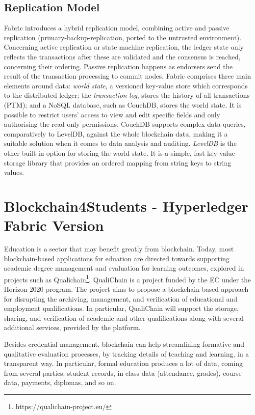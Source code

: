 \documentclass[12pt,a4paper]{article}
\theoremstyle{definition}
\begin{document}
\subsection{Replication Model}
Fabric introduces a hybrid replication model, combining active and passive replication (primary-backup-replication, ported to the untrusted environment). Concerning active replication or state machine replication, the ledger state only reflects the transactions after these are validated and the consensus is reached, concerning their ordering.  Passive replication happens as endorsers send the result of the transaction processing to commit nodes. Fabric comprises three main elements around data: \emph{world state}, a versioned key-value store which corresponds to the distributed ledger; the \emph{transaction log}, stores the history of all transactions (PTM); and a NoSQL database, such as CouchDB, stores the world state. It is possible to restrict users' access to view and edit specific fields and only authorising the read-only permissions.  CouchDB supports complex data queries, comparatively to LevelDB, against the whole blockchain data, making it a suitable solution when it comes to data analysis and auditing. \emph{LevelDB} is the other built-in option for storing the world state. It is a simple, fast key-value storage library that provides an ordered mapping from string keys to string values.


\section{Blockchain4Students - Hyperledger Fabric Version}
 Education is a sector that may benefit greatly from blockchain. Today, most blockchain-based applications for eduation are directed towards supporting academic degree management and evaluation for learning outcomes, explored in projects such as Qualichain\footnote{https://qualichain-project.eu/}. QualiChain is a project funded by the EC under the Horizon 2020 program. The project aims to propose a blockchain-based approach for disrupting the archiving, management, and verification of educational and employment qualifications. In particular, QualiChain will support the storage,  sharing, and verification of academic and other qualifications along with several additional services, provided by the platform.

Besides credential management, blockchain can help streamlining formative and qualitative evaluation processes, by tracking details of teaching and learning, in a transparent way. In particular, formal education produces a lot of data, coming from several parties: student records, in-class data (attendance, grades), course data, payments, diplomas, and so on. %
\end{document}
